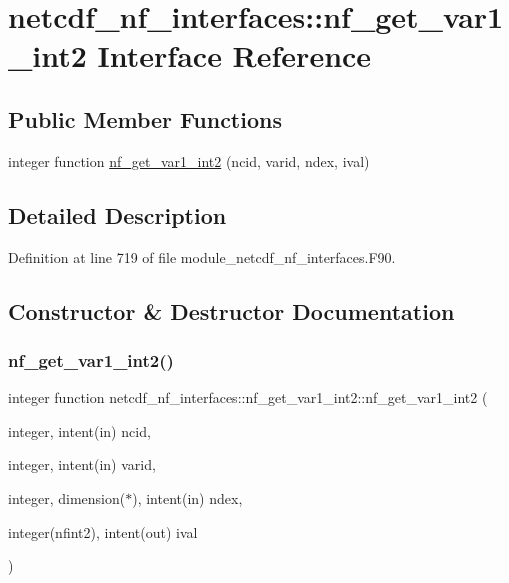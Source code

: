 \hypertarget{interfacenetcdf__nf__interfaces_1_1nf__get__var1__int2}{}\section{netcdf\+\_\+nf\+\_\+interfaces\+:\+:nf\+\_\+get\+\_\+var1\+\_\+int2 Interface Reference}
\label{interfacenetcdf__nf__interfaces_1_1nf__get__var1__int2}
\subsection*{Public Member Functions}
\begin{DoxyCompactItemize}
\item 
integer function \hyperlink{interfacenetcdf__nf__interfaces_1_1nf__get__var1__int2_aeabcf42fb7ac61fac9b05539445f84e1}{nf\+\_\+get\+\_\+var1\+\_\+int2} (ncid, varid, ndex, ival)
\end{DoxyCompactItemize}


\subsection{Detailed Description}


Definition at line 719 of file module\+\_\+netcdf\+\_\+nf\+\_\+interfaces.\+F90.



\subsection{Constructor \& Destructor Documentation}
\mbox{\label{interfacenetcdf__nf__interfaces_1_1nf__get__var1__int2_aeabcf42fb7ac61fac9b05539445f84e1}} 
\subsubsection{\texorpdfstring{nf\+\_\+get\+\_\+var1\+\_\+int2()}{nf\_get\_var1\_int2()}}
{\footnotesize\ttfamily integer function netcdf\+\_\+nf\+\_\+interfaces\+::nf\+\_\+get\+\_\+var1\+\_\+int2\+::nf\+\_\+get\+\_\+var1\+\_\+int2 (\begin{DoxyParamCaption}\item[{integer, intent(in)}]{ncid,  }\item[{integer, intent(in)}]{varid,  }\item[{integer, dimension($\ast$), intent(in)}]{ndex,  }\item[{integer(nfint2), intent(out)}]{ival }\end{DoxyParamCaption})}



